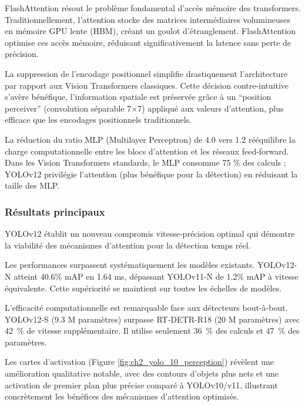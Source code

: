 FlashAttention \cite{dao_flashattention_2022} résout le problème fondamental d'accès mémoire des transformers. Traditionnellement, l'attention stocke des matrices intermédiaires volumineuses en mémoire GPU lente (HBM), créant un goulot d'étranglement. FlashAttention optimise ces accès mémoire, réduisant significativement la latence sans perte de précision.

La suppression de l'encodage positionnel simplifie drastiquement l'architecture par rapport aux Vision Transformers classiques. Cette décision contre-intuitive s'avère bénéfique, l'information spatiale est préservée grâce à un ``position perceiver'' (convolution séparable 7×7) appliqué aux valeurs d'attention, plus efficace que les encodages positionnels traditionnels.

La réduction du ratio MLP (Multilayer Perceptron) de 4.0 vers 1.2 rééquilibre la charge computationnelle entre les blocs d'attention et les réseaux feed-forward. Dans les Vision Transformers standards, le MLP consomme 75 \% des calculs ; YOLOv12 privilégie l'attention (plus bénéfique pour la détection) en réduisant la taille des MLP.


\subsubsection{Résultats principaux}
YOLOv12 établit un nouveau compromis vitesse-précision optimal qui démontre la viabilité des mécanismes d'attention pour la détection temps réel.

Les performances surpassent systématiquement les modèles existants. YOLOv12-N atteint 40.6\% mAP en 1.64 ms, dépassant YOLOv11-N de 1.2\% mAP à vitesse équivalente. Cette supériorité se maintient sur toutes les échelles de modèles.

L'efficacité computationnelle est remarquable face aux détecteurs bout-à-bout. YOLOv12-S (9.3 M paramètres) surpasse RT-DETR-R18 \cite{zhao_detrs_2024} (20 M paramètres) avec 42~\% de vitesse supplémentaire. Il utilise seulement 36~\% des calculs et 47~\% des paramètres.

Les cartes d'activation (Figure \ref{fig:ch2_yolo_10_perception}) révèlent une amélioration qualitative notable, avec des contours d'objets plus nets et une activation de premier plan plus précise comparé à YOLOv10/v11, illustrant concrètement les bénéfices des mécanismes d'attention optimisés.

